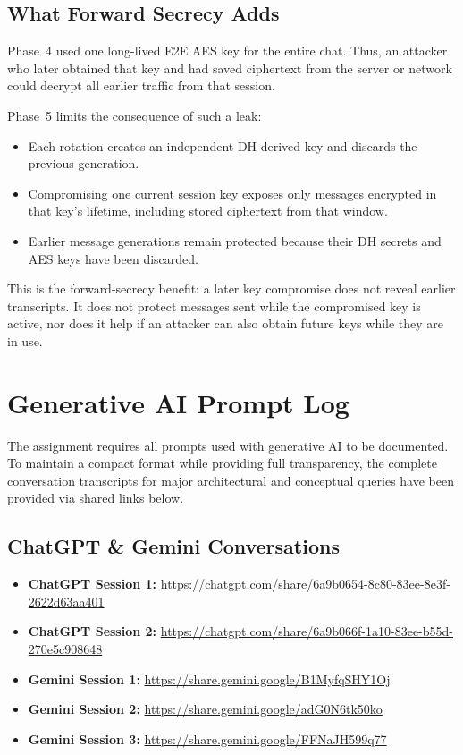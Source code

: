 \documentclass[11pt]{article}
\begin{document}
\subsection{What Forward Secrecy Adds}

Phase~4 used one long-lived E2E AES key for the entire chat. Thus, an attacker who later obtained that key and had saved ciphertext from the server or network could decrypt all earlier traffic from that session.

Phase~5 limits the consequence of such a leak:

\begin{itemize}
    \item Each rotation creates an independent DH-derived key and discards the previous generation.
    \item Compromising one current session key exposes only messages encrypted in that key's lifetime, including stored ciphertext from that window.
    \item Earlier message generations remain protected because their DH secrets and AES keys have been discarded.
\end{itemize}

This is the forward-secrecy benefit: a later key compromise does not reveal earlier transcripts. It does not protect messages sent while the compromised key is active, nor does it help if an attacker can also obtain future keys while they are in use.

\appendix
\section{Generative AI Prompt Log}

The assignment requires all prompts used with generative AI to be documented. To maintain a compact format while providing full transparency, the complete conversation transcripts for major architectural and conceptual queries have been provided via shared links below.

\subsection*{ChatGPT \& Gemini Conversations}
\begin{itemize}
    \item \textbf{ChatGPT Session 1:} \url{https://chatgpt.com/share/6a9b0654-8c80-83ee-8e3f-2622d63aa401}
    \item \textbf{ChatGPT Session 2:} \url{https://chatgpt.com/share/6a9b066f-1a10-83ee-b55d-270e5c908648}
    \item \textbf{Gemini Session 1:} \url{https://share.gemini.google/B1MyfqSHY1Oj}
    \item \textbf{Gemini Session 2:} \url{https://share.gemini.google/adG0N6tk50ko}
    \item \textbf{Gemini Session 3:} \url{https://share.gemini.google/FFNaJH599q77}
\end{itemize}
\end{document}
